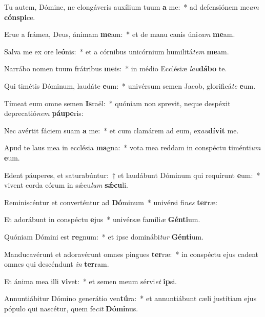 \item Tu autem, Dómine, ne elongáveris auxílium tuum \textbf{a} me:~* ad defensiónem me\textit{am} \textbf{cón}\textbf{spi}ce.
\item Erue a frámea, Deus, ánimam \textbf{me}am:~* et de manu canis úni\textit{cam} \textbf{me}am.
\item Salva me ex ore le\textbf{ó}nis:~* et a córnibus unicórnium humilitá\textit{tem} \textbf{me}am.
\item Narrábo nomen tuum frátribus \textbf{me}is:~* in médio Ecclésiæ \textit{lau}\textbf{dá}\textbf{bo} te.
\item Qui timétis Dóminum, laudáte \textbf{e}um:~* univérsum semen Jacob, glorificá\textit{te} \textbf{e}um.
\item Tímeat eum omne semen \textbf{Is}raël:~* quóniam non sprevit, neque despéxit deprecatió\textit{nem} \textbf{páu}\textbf{pe}ris:
\item Nec avértit fáciem suam \textbf{a} me:~* et cum clamárem ad eum, ex\textit{au}\textbf{dí}\textbf{vit} me.
\item Apud te laus mea in ecclésia \textbf{ma}gna:~* vota mea reddam in conspéctu timénti\textit{um} \textbf{e}um.
\item Edent páuperes, et saturabúntur:~† et laudábunt Dóminum qui requírunt \textbf{e}um:~* vivent corda eórum in sǽcu\textit{lum} \textbf{sǽ}\textbf{cu}li.
\item Reminiscéntur et converténtur ad \textbf{Dó}minum~* univérsi fi\textit{nes} \textbf{ter}ræ:
\item Et adorábunt in conspéctu \textbf{e}jus~* univérsæ famíli\textit{æ} \textbf{Gén}\textbf{ti}um.
\item Quóniam Dómini est \textbf{re}gnum:~* et ipse dominábi\textit{tur} \textbf{Gén}\textbf{ti}um.
\item Manducavérunt et adoravérunt omnes pingues \textbf{ter}ræ:~* in conspéctu ejus cadent omnes qui descéndunt \textit{in} \textbf{ter}ram.
\item Et ánima mea illi \textbf{vi}vet:~* et semen meum sérvi\textit{et} \textbf{ip}si.
\item Annuntiábitur Dómino generátio ven\textbf{tú}ra:~* et annuntiábunt cæli justítiam ejus pópulo qui nascétur, quem fe\textit{cit} \textbf{Dó}\textbf{mi}nus.
